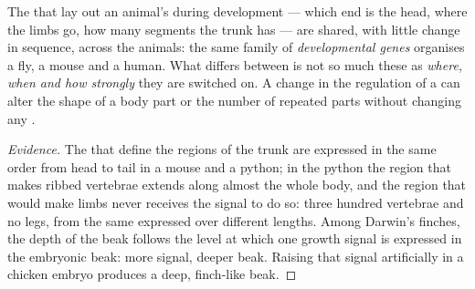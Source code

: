\begin{proposition}\label{prop:g12:diversification-of-life:development}
The  that lay out an animal's  during development ---
which end is the head, where the limbs go, how many segments the trunk
has --- are shared, with little change in sequence, across the animals:
the same family of \emph{developmental genes}
organises a fly, a mouse and a human. What differs between
 is not so much these  as \emph{where, when and how
strongly} they are switched on. A change in the regulation of a
 can alter the shape of a body part or the number of
repeated parts without changing any .
\end{proposition}
\begin{proof}[Evidence]
The  that define the regions of the trunk are expressed in the
same order from head to tail in a mouse and a python; in the python the
region that makes ribbed vertebrae extends along almost the whole
body, and the region that would make limbs never receives the signal
to do so: three hundred vertebrae and no legs, from the same 
expressed over different lengths. Among Darwin's finches, the depth of
the beak follows the level at which one growth signal is expressed in
the embryonic beak: more signal, deeper beak. Raising that signal
artificially in a chicken embryo produces a deep, finch-like beak.
\end{proof}

